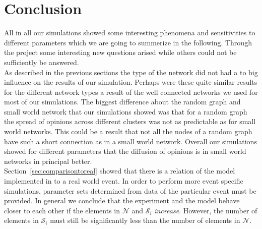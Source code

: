 
\section{Conclusion}
\label{sec:conclusion}

All in all our simulations showed some interesting phenomena and sensitivities to different parameters which we are going to summerize in the following. Through the project some interesting new questions arised while others could not be sufficiently be answered. \\
As described in the previous sections the type of the network did not had a to big influence on the results of our simulation. Perhaps were these quite similar results for the different network types a result of the well connected networks we used for most of our simulations. The biggest difference about the random graph and small world network that our simulations showed was that for a random graph the spread of opinions across different clusters was not as predictable as for small world networks. This could be a result that not all the nodes of a random graph have such a short connection as in a small world network. Overall our simulations showed for different parameters that the diffusion of opinions is in small world networks in principal better. \\
Section~\ref{sec:comparisontoreal} showed that there is a relation of the model implemented in \matlab to a real world event.  In order to perform more event specific simulations, parameter sets determined from data of the particular event must be provided.  In general we conclude that the experiment and the model behave closer to each other if the elements in $\mathcal{N}$ and $\mathcal{S}_i$ \emph{increase}.  However, the number of elements in $\mathcal{S}_i$ must still be significantly less than the number of elements in $\mathcal{N}$. \\



